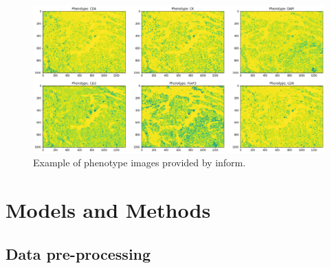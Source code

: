 \documentclass[11pt,conference,compsocconf]{IEEEtran}
\begin{document}
 \begin{figure}[tbp]
  \centering
  \includegraphics[width=\columnwidth]{doc/report/images/phenotypes.png}
  \caption{Example of phenotype images provided by inform.}
  \vspace{-3mm}
  \label{fig:phenotypes}
\end{figure}

\section{Models and Methods}\label{sec:models-methods}
\subsection{Data pre-processing}\label{subsec:data_pre_proc}
\end{document}
